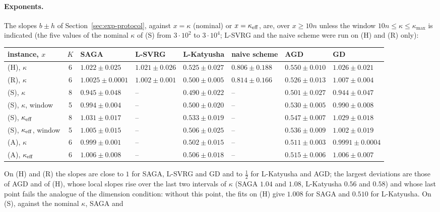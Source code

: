 \paragraph{Exponents.}
The slopes $b\pm h$ of Section~\ref{sec:exp-protocol}, against $x=\kappa$ (nominal) or $x=\kappa_{\rm eff}$, are, over
$x\ge10n$ unless the window $10n\le\kappa\le\kappa_{\max}$ is indicated (the five values of the nominal $\kappa$ of (S)
from $3\cdot10^2$ to $3\cdot10^4$; L-SVRG and the naive scheme were run on (H) and (R) only):
\begin{center}
\footnotesize
\setlength{\tabcolsep}{3.5pt}
\begin{tabular}{@{}lcllllll@{}}
\toprule
instance, $x$ & $K$ & SAGA & L-SVRG & L-Katyusha & naive scheme & AGD & GD \\
\midrule
(H), $\kappa$ & 6 & $1.022\pm0.025$ & $1.021\pm0.026$ & $0.525\pm0.027$ & $0.806\pm0.188$ & $0.550\pm0.010$ & $1.026\pm0.021$ \\
(R), $\kappa$ & 6 & $1.0025\pm0.0001$ & $1.002\pm0.001$ & $0.500\pm0.005$ & $0.814\pm0.166$ & $0.526\pm0.013$ & $1.007\pm0.004$ \\
(S), $\kappa$ & 8 & $0.945\pm0.048$ & -- & $0.490\pm0.022$ & -- & $0.501\pm0.027$ & $0.944\pm0.047$ \\
(S), $\kappa$, window & 5 & $0.994\pm0.004$ & -- & $0.500\pm0.020$ & -- & $0.530\pm0.005$ & $0.990\pm0.008$ \\
(S), $\kappa_{\rm eff}$ & 8 & $1.031\pm0.017$ & -- & $0.533\pm0.019$ & -- & $0.547\pm0.007$ & $1.029\pm0.018$ \\
(S), $\kappa_{\rm eff}$, window & 5 & $1.005\pm0.015$ & -- & $0.506\pm0.025$ & -- & $0.536\pm0.009$ & $1.002\pm0.019$ \\
(A), $\kappa$ & 6 & $0.999\pm0.001$ & -- & $0.502\pm0.015$ & -- & $0.511\pm0.003$ & $0.9991\pm0.0004$ \\
(A), $\kappa_{\rm eff}$ & 6 & $1.006\pm0.008$ & -- & $0.506\pm0.018$ & -- & $0.515\pm0.006$ & $1.006\pm0.007$ \\
\bottomrule
\end{tabular}
\end{center}
On (H) and (R) the slopes are close to $1$ for SAGA, L-SVRG and GD and to $\frac12$ for L-Katyusha and AGD; the largest
deviations are those of AGD and of (H), whose local slopes rise over the last two intervals of $\kappa$ (SAGA $1.04$ and
$1.08$, L-Katyusha $0.56$ and $0.58$) and whose last point fails the analogue of the dimension condition: without this
point, the fits on (H) give $1.008$ for SAGA and $0.510$ for L-Katyusha. On (S), against the nominal $\kappa$, SAGA and
